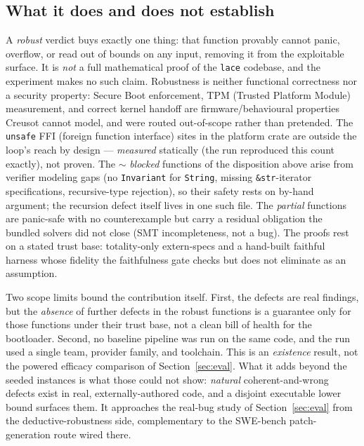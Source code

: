 \documentclass[11pt]{article}
\newcommand{\code}[1]{\texttt{#1}}
\begin{document}
\subsection{What it does and does not establish}
\label{sec:realworld-scope}

A \emph{robust} verdict buys exactly one thing: that function provably cannot panic, overflow,
or read out of bounds on any input, removing it from the exploitable surface. It is \emph{not} a
full mathematical proof of the \code{lace} codebase, and the experiment makes no such claim.
Robustness is neither functional correctness nor a security property: Secure Boot enforcement,
TPM (Trusted Platform Module) measurement, and correct kernel handoff are firmware/behavioural
properties Creusot cannot
model, and were routed out-of-scope rather than pretended. The \ResRWUnsafePlatform{}
\code{unsafe} FFI (foreign function interface) sites in the platform crate are outside the loop's reach by design ---
\emph{measured} statically (the run reproduced this count exactly), not proven. The
${\sim}$\ResRWBlocked{} \emph{blocked} functions of the disposition above arise from verifier modeling gaps (no
\code{Invariant} for \code{String}, missing \code{\&str}-iterator specifications, recursive-type
rejection), so their safety rests on by-hand argument; the recursion defect itself lives in one
such file. The \ResRWPartial{} \emph{partial} functions are panic-safe with no counterexample
but carry a residual obligation the bundled solvers did not close (SMT incompleteness, not a
bug). The proofs rest on a stated trust base: totality-only extern-specs and a hand-built
faithful harness whose fidelity the faithfulness gate checks but does not eliminate as an
assumption.

Two scope limits bound the contribution itself. First, the \ResRWBugsNum{} defects are real
findings, but the \emph{absence} of further defects in the robust functions is a guarantee only
for those functions under their trust base, not a clean bill of health for the bootloader.
Second, no baseline pipeline was run on the same code, and the run used a single team, provider
family, and toolchain. This is an \emph{existence} result, not the powered efficacy comparison of
Section~\ref{sec:eval}. What it adds beyond the seeded instances is what those could not show:
\emph{natural} coherent-and-wrong defects exist in real, externally-authored code, and a disjoint
executable lower bound surfaces them. It approaches the real-bug study of Section~\ref{sec:eval}
from the deductive-robustness side, complementary to the SWE-bench \citep{jimenez2023swebench}
patch-generation route wired there.
\end{document}
